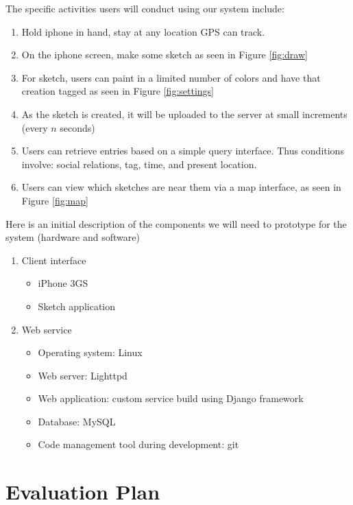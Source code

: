 \documentclass{article}
\begin{document}
The specific activities users will conduct using our system include:
\begin{enumerate}
\item Hold iphone in hand, stay at any location GPS can track.
\item On the iphone screen, make some sketch as seen in Figure \ref{fig:draw}
\item For sketch, users can paint in a limited number of colors and have that
	creation tagged as seen in Figure \ref{fig:settings}
\item As the sketch is created, it will be uploaded to the server at small
	increments (every $n$ seconds)
\item Users can retrieve entries based on a simple query interface. Thus
	conditions involve: social relations, tag, time, and present location.
\item Users can view which sketches are near them via a map interface, as seen
	in Figure \ref{fig:map}
\end{enumerate}

Here is an initial description of the components we will need to prototype for
the system (hardware and software)

\begin{enumerate}
\item Client interface
        \begin{itemize}
        \item iPhone 3GS
        \item  Sketch application
        \end{itemize}

\item Web service
        \begin{itemize}
        \item Operating system: Linux
        \item Web server: Lighttpd
        \item Web application: custom service build using Django framework
        \item Database: MySQL
        \item Code management tool during development: git
        \end{itemize}
\end{enumerate}


\section{ Evaluation Plan }
\end{document}
